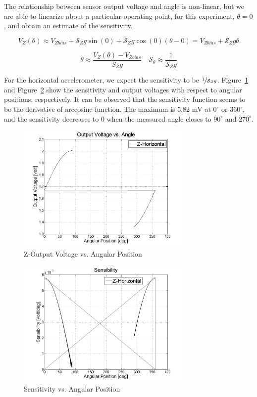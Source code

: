 \documentclass{article}
\theoremstyle{plain}
\theoremstyle{definition}
\theoremstyle{remark}
\newcommand{\Sens}{\mathcal{S}}
\begin{document}
The relationship between sensor output voltage and angle is non-linear, but we are able to linearize about a particular operating point, for this experiment, $\theta = 0$, and obtain an estimate of the sensitivity.

$$ V_{Z}(\theta) \approx V_{Zbias} + \Sens_{Z} g \sin(0) + \Sens_{Z} g \cos(0) \left(\theta - 0\right) = V_{Zbias} + \Sens_{Z} g \theta $$

$$ \theta \approx \frac{V_{Z}(\theta) - V_{Zbias}}{S_Z g}  \quad \Sens_\theta \approx \frac{1}{\Sens_Z g}$$

For the horizontal accelerometer, we expect the sensitivity to be $\sfrac{1}{\Sens_{Z} g}$.  Figure~\ref{Z_Vol_vs_Angle} and Figure~\ref{Z_Sensibility} show the sensitivity and output voltages with respect to angular positions, respectively. It can be observed that the sensitivity function seems to be the derivative of arccosine function. The maximum is 5.82 mV at $0^\circ$ or $360^\circ$, and the sensitivity decreases to 0 when the measured angle closes to $90^\circ$ and $270^\circ$.

\begin{figure}[hbt]
\begin{center}
\includegraphics[width = 8.5cm]{Z_Vol_vs_Angle.png}
\caption{Z-Output Voltage vs. Angular Position}
\label{Z_Vol_vs_Angle}
\end{center}
\end{figure}

\begin{figure}[hbt]
\begin{center}
\includegraphics[width = 8.5cm]{Z_Sensibility.png}
\caption{Sensitivity vs. Angular Position}
\label{Z_Sensibility}
\end{center}
\end{figure}
\end{document}

